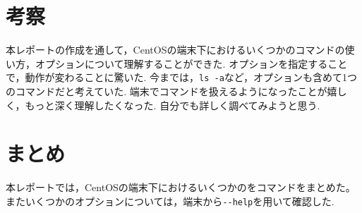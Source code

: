 \documentclass[a4j,11pt]{jarticle}
\begin{document}


\section{考察}
本レポートの作成を通して，CentOSの端末下におけるいくつかのコマンドの使い方，オプションについて理解することができた.
オプションを指定することで，動作が変わることに驚いた.
今までは，\verb|ls -a|など，オプションも含めて1つのコマンドだと考えていた.
端末でコマンドを扱えるようになったことが嬉しく，もっと深く理解したくなった.
自分でも詳しく調べてみようと思う.

\section{まとめ}
本レポートでは，CentOSの端末下におけるいくつかのをコマンドをまとめた。またいくつかのオプションについては，端末から\verb|--help|を用いて確認した.
\end{document}
